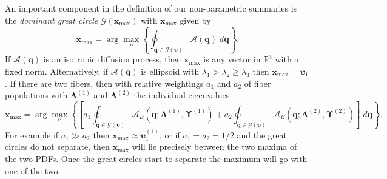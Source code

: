 \documentclass[dvips,aoas,preprint]{imsart}
\numberwithin{equation}{section}
\theoremstyle{plain}
\newcommand{\q}{\mathbf{q}}
\newcommand{\bu}{\bs{\upsilon}}
\newcommand{\x}{\mathbf{x}}
\newcommand{\cA}{\mathcal{A}}
\newcommand{\cG}{\mathcal{G}}
\newcommand{\bs}[1]{\boldsymbol{#1}}
\begin{document}
An important component in the definition of our non-parametric
summaries is the {\em dominant great circle} $\cG(\x_\text{max})$ with
$\x_\text{max}$ given by
\begin{equation}
  \x_\text{max}=\arg \max_{\bu}\left\{ \oint_{\q\in\cG(\bu)}
  {\cA}\left(\q\right)\;d\q \right\}.
\end{equation}
If ${\cA}\left(\q\right)$ is an isotropic diffusion process, then
$\x_\text{max}$ is any vector in ${\mathbb{R}}^3$ with a fixed norm.
Alternatively, if ${\cA}\left(\q\right)$ is ellipsoid with
$\lambda_1>\lambda_2\ge \lambda_3$ then $\x_\text{max}=\bu_1$.  If
there are two fibers, then with relative weightings $a_1$ and $a_2$ of
fiber populations with $\bs{\Lambda}^{(1)}$ and $\bs{\Lambda}^{(2)}$
the individual eigenvalues
\begin{equation}
  \x_\text{max} = \arg \max_{\bu}\left\{\left[ a_1
    \oint_{\q\in\cG(\bu)}
    {\cA}_E\left(\q;\bs{\Lambda}^{(1)},\bs{\Upsilon}^{(1)}\right) + a_2
    \oint_{\q\in\cG(\bu)}
    {\cA}_E\left(\q;\bs{\Lambda}^{(2)},\bs{\Upsilon}^{(2)}\right)\right]\;d\q
    \right\}.
\end{equation}
For example if $a_1\gg{a_2}$ then $\x_\text{max}\approx\bu_1^{(1)}$,
or if $a_1=a_2=1/2$ and the great circles do not separate, then
$\x_\text{max}$ will lie precisely between the two maxima of the two
PDFs.  Once the great circles start to separate the maximum will go
with one of the two.
\end{document}
